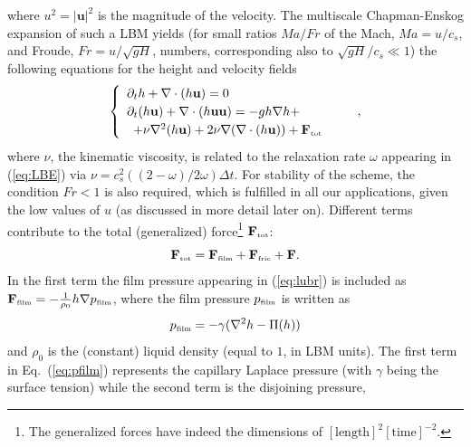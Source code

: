 where $u^2 = |\mathbf{u}|^2$ is the magnitude of the velocity.
The multiscale Chapman-Enskog expansion \cite{chapmanMathematicalTheoryNonuniform1990,enskogKinetischeTheorieVorgange1917} of such a
LBM yields (for small ratios $Ma/Fr$
of the Mach, $Ma=u/c_s$, and Froude, $Fr = u/\sqrt{gH}$, numbers,
corresponding also to $\sqrt{g H}/c_s \ll 1$) the following equations
for the height and velocity fields~\cite{dellarNonhydrodynamicModesPriori2002,vanthangStudy1DLattice2010,salmonLatticeBoltzmannMethod1999}
\begin{equation}\label{eq:hydro}
\begin{cases}
\begin{array}{ll}
\partial_t h + \nabla \cdot (h \mathbf{u})  = 0 & \\ 
\partial_t (h \mathbf{u}) + \nabla \cdot (h \mathbf{u}\mathbf{u}) = -gh \nabla h +\\ 
\,\,\, +  \nu \nabla^2 (h\mathbf{u}) + 2\nu \nabla (\nabla \cdot (h\mathbf{u})) +
\mathbf{F}_{\mbox{\tiny{tot}}} 
\end{array}
\end{cases},
\end{equation}
where $\nu$, the kinematic viscosity, is related to the relaxation rate $\omega$ appearing
in (\ref{eq:LBE}) via $\nu = c_s^2((2-\omega)/2\omega)\Delta t$. 
For stability of the scheme, the condition $Fr < 1$
is also required, which is fulfilled in all our applications,
given the low values of $u$ (as discussed in more detail later on).
Different terms contribute to the total (generalized) force\footnote{The generalized forces have
indeed the dimensions of $[\mbox{length}]^2[\mbox{time}]^{-2}$.}
$\mathbf{F}_{\mbox{\tiny{tot}}}$:
\begin{equation}\label{eq:force}
\mathbf{F}_{\mbox{\tiny{tot}}} = \mathbf{F}_{\mbox{\tiny{film}}} + \mathbf{F}_{\mbox{\tiny{fric}}} + \mathbf{F}. 
\end{equation}
In the first term the film pressure appearing in (\ref{eq:lubr}) is included as
$\mathbf{F}_{\mbox{\tiny{film}}} = -\frac{1}{\rho_0}h\nabla p_{\mbox{\tiny{film}}}$, where the film pressure $p_{\mbox{\tiny{film}}}$ 
is written as
\begin{equation}\label{eq:pfilm}
p_{\mbox{\tiny{film}}} = - \gamma (\nabla^2 h -\Pi(h))
\end{equation}
and $\rho_0$ is the (constant) liquid density 
(equal to $1$, in LBM units). 
The first term in Eq.~(\ref{eq:pfilm}) represents the capillary Laplace pressure (with $\gamma$
being the surface tension) while the second term is the disjoining pressure,

